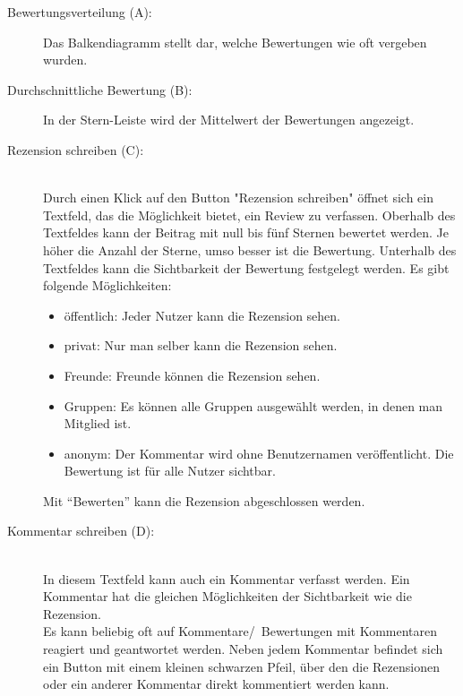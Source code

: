    \begin{description} 
        \item [Bewertungsverteilung (A):] Das Balkendiagramm stellt dar, welche Bewertungen wie oft vergeben wurden.  %
        \item [Durchschnittliche Bewertung (B):] In der Stern-Leiste wird der Mittelwert der Bewertungen angezeigt.
        \item [Rezension schreiben (C):] \hfill \\
				Durch einen Klick auf den Button "Rezension schreiben" öffnet sich ein Textfeld, das die Möglichkeit bietet, ein Review zu verfassen. Oberhalb des Textfeldes kann der Beitrag mit null bis fünf Sternen bewertet werden. Je höher die Anzahl der Sterne, umso besser ist die Bewertung. Unterhalb des Textfeldes kann die Sichtbarkeit der Bewertung festgelegt werden. Es gibt folgende Möglichkeiten:
        \begin{itemize}
            \item öffentlich: Jeder Nutzer kann die Rezension sehen.
            \item privat: Nur man selber kann die Rezension sehen.
            \item Freunde: Freunde können die Rezension sehen.
            \item Gruppen: Es können alle Gruppen ausgewählt werden, in denen man Mitglied ist.
            \item anonym: Der Kommentar wird ohne Benutzernamen veröffentlicht. Die Bewertung ist für alle Nutzer sichtbar.
        \end{itemize}
     Mit \enquote{Bewerten} kann die Rezension abgeschlossen werden.
             \item [Kommentar schreiben (D):] \hfill \\
				In diesem Textfeld kann auch ein Kommentar verfasst werden. Ein Kommentar hat die gleichen Möglichkeiten der Sichtbarkeit wie die Rezension.\\
Es kann beliebig oft auf Kommentare/~Bewertungen mit Kommentaren reagiert und geantwortet werden. Neben jedem Kommentar befindet sich ein Button mit einem kleinen schwarzen Pfeil, über den die Rezensionen oder ein anderer Kommentar direkt kommentiert werden kann. 
    \end{description}


